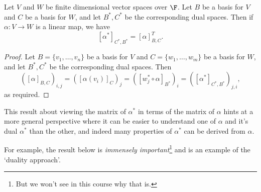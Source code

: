 \documentclass[a4paper]{scrartcl}
\begin{document}
\begin{theorem}
    Let $V$ and $W$ be finite dimensional vector spaces over $\F$. Let $B$ be a basis for $V$ and $C$ be a basis for $W$, and let $B^*, C^*$ be the corresponding dual spaces.
    Then if $\alpha: V \rightarrow W$ is a linear map, we have
    $$
    [\alpha^*]_{C^*, B^*} = [\alpha]_{B, C}^T.
    $$
\end{theorem}
\begin{proof}
    Let $B = \{v_1, \dots, v_n\}$ be a basis for $V$ and $C = \{w_1, \dots, w_m\}$ be a basis for $W$, and let $B^*, C^*$ be the corresponding dual spaces. Then 
    $$
    ([\alpha]_{B, C})_{i, j} = ([\alpha(v_i)]_{C})_j = ([w_j^* \circ \alpha]_{B^*})_i = ([\alpha^*]_{C^*, B^*})_{j, i},
    $$
    as required.
\end{proof}

This result about viewing the matrix of $\alpha^*$ in terms of the matrix of $\alpha$ hints at a more general perspective where it can be easier to understand one of $\alpha$ and it's dual $\alpha^*$ than the other, and indeed many properties of $\alpha^*$ can be derived from $\alpha$. 

For example, the result below is \emph{immensely important}\footnote{But we won't see in this course why that is.} and is an example of the `duality approach'. 
\end{document}
